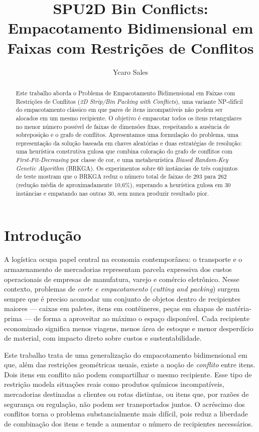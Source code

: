 \documentclass{report}
\title{SPU2D Bin Conflicts:\\ Empacotamento Bidimensional em Faixas com Restrições de Conflitos}
\author{Ycaro Sales}
\begin{document}
\maketitle

\begin{abstract}
Este trabalho aborda o Problema de Empacotamento Bidimensional em Faixas com
Restrições de Conflitos (\textit{2D Strip/Bin Packing with Conflicts}), uma
variante NP-difícil do empacotamento clássico em que pares de itens
incompatíveis não podem ser alocados em um mesmo recipiente. O objetivo é
empacotar todos os itens retangulares no menor número possível de faixas de
dimensões fixas, respeitando a ausência de sobreposição e o grafo de conflitos.
Apresentamos uma formulação do problema, uma representação da solução baseada em
chaves aleatórias e duas estratégias de resolução: uma heurística construtiva
gulosa que combina coloração do grafo de conflitos com
\textit{First-Fit-Decreasing} por classe de cor, e uma metaheurística
\textit{Biased Random-Key Genetic Algorithm} (BRKGA). Os experimentos sobre 60
instâncias de três conjuntos de teste mostram que o BRKGA reduz o número total
de faixas de 293 para 262 (redução média de aproximadamente 10{,}6\%),
superando a heurística gulosa em 30 instâncias e empatando nas outras 30, sem
nunca produzir resultado pior.
\end{abstract}

\newpage
\tableofcontents
\newpage

\chapter{Introdução}

A logística ocupa papel central na economia contemporânea: o transporte e o
armazenamento de mercadorias representam parcela expressiva dos custos
operacionais de empresas de manufatura, varejo e comércio eletrônico. Nesse
contexto, problemas de \emph{corte e empacotamento} (\textit{cutting and
packing}) surgem sempre que é preciso acomodar um conjunto de objetos dentro de
recipientes maiores --- caixas em paletes, itens em contêineres, peças em chapas
de matéria-prima --- de forma a aproveitar ao máximo o espaço disponível. Cada
recipiente economizado significa menos viagens, menos área de estoque e menor
desperdício de material, com impacto direto sobre custos e sustentabilidade.

Este trabalho trata de uma generalização do empacotamento bidimensional em que,
além das restrições geométricas usuais, existe a noção de \emph{conflito} entre
itens. Dois itens em conflito não podem compartilhar o mesmo recipiente. Esse
tipo de restrição modela situações reais como produtos químicos incompatíveis,
mercadorias destinadas a clientes ou rotas distintas, ou itens que, por razões
de segurança ou regulação, não podem ser transportados juntos. O acréscimo dos
conflitos torna o problema substancialmente mais difícil, pois reduz a
liberdade de combinação dos itens e tende a aumentar o número de recipientes
necessários.
\end{document}
